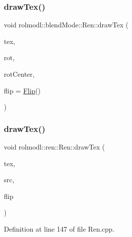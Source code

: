 \subsubsection{\texorpdfstring{drawTex()}{drawTex()}\hspace{0.1cm}{\footnotesize\ttfamily [12/36]}}
{\footnotesize\ttfamily void rolmodl\+::blend\+Mode\+::\+Ren\+::draw\+Tex (\begin{DoxyParamCaption}\item[{Tex \&}]{tex,  }\item[{const double}]{rot,  }\item[{const \mbox{\hyperlink{structrolmodl_1_1geom_1_1_pos}{geom\+::\+Pos}}}]{rot\+Center,  }\item[{const \mbox{\hyperlink{structrolmodl_1_1blend_mode_1_1_flip}{Flip}}}]{flip = {\ttfamily \mbox{\hyperlink{structrolmodl_1_1blend_mode_1_1_flip}{Flip}}()} }\end{DoxyParamCaption})}

\mbox{\label{classrolmodl_1_1blend_mode_1_1_ren_a874a1f1882ac76390a5c9581d94a17be}} 
\subsubsection{\texorpdfstring{drawTex()}{drawTex()}\hspace{0.1cm}{\footnotesize\ttfamily [13/36]}}
{\footnotesize\ttfamily void rolmodl\+::ren\+::\+Ren\+::draw\+Tex (\begin{DoxyParamCaption}\item[{Tex \&}]{tex,  }\item[{const \mbox{\hyperlink{structrolmodl_1_1blend_mode_1_1_src_rect_w_h}{Src\+Rect\+WH}}}]{src,  }\item[{const \mbox{\hyperlink{structrolmodl_1_1blend_mode_1_1_flip}{Flip}}}]{flip }\end{DoxyParamCaption})}



Definition at line 147 of file Ren.\+cpp.

\mbox{\label{classrolmodl_1_1blend_mode_1_1_ren_a0a8de5df2b222bce8aa536d005f140a8}} 
